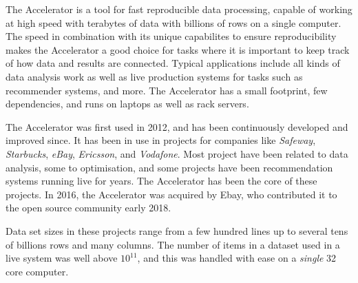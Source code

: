 
The Accelerator is a tool for fast reproducible data processing,
capable of working at high speed with terabytes of data with billions
of rows on a single computer.  The speed in combination with its
unique capabilites to ensure reproducibility makes the Accelerator a
good choice for tasks where it is important to keep track of how data
and results are connected.  Typical applications include all kinds of
data analysis work as well as live production systems for tasks such
as recommender systems, and more.  The Accelerator has a small
footprint, few dependencies, and runs on laptops as well as rack
servers.

The Accelerator was first used in 2012, and has been continuously developed and
improved since.  It has been in use in projects for companies like
\textsl{Safeway}, \textsl{Starbucks}, \textsl{eBay}, \textsl{Ericsson},
and \textsl{Vodafone}.  Most project have been related to data
analysis, some to optimisation, and some projects have been
recommendation systems running live for years.  The Accelerator has
been the core of these projects.  In 2016, the Accelerator was
acquired by Ebay, who contributed it to the open source community
early 2018.

Data set sizes in these projects range from a few hundred lines up to
several tens of billions rows and many columns.  The number of
items in a dataset used in a live system was well above $10^{11}$, and
this was handled with ease on a \emph{single} 32 core computer.

